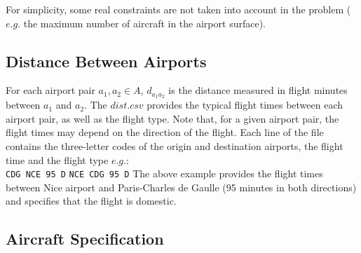 \documentclass[ijoo,nonblindrev]{informs-ijoo}
\begin{document}
For simplicity, some real constraints are not taken into account in the problem ($e. g.$ the maximum number of aircraft in the airport surface).

\subsection{Distance Between Airports} \label{subsec:distance}

For each airport pair $a_1, a_2  \in  A $, $d_{a_1 a_2}$ is the distance measured in flight minutes between $a_1$ and $a_2$.
The $dist.csv$ provides the typical flight times between each airport pair, as well as the flight type. Note that, for a given airport pair, the flight times may depend on the direction of the flight. Each line of the file contains the three-letter codes of the origin and destination airports, the flight time and the flight type $e.g.$: \\
\newline
{\texttt{\footnotesize CDG NCE 95 D}}
\newline
{\texttt{\footnotesize NCE CDG 95 D}}
\newline
\newline
The above example provides the flight times between Nice airport and Paris-Charles de Gaulle (95 minutes in both directions) and specifies that the flight is domestic.

\subsection{Aircraft Specification } \label{subsec:aicraft}
\end{document}
